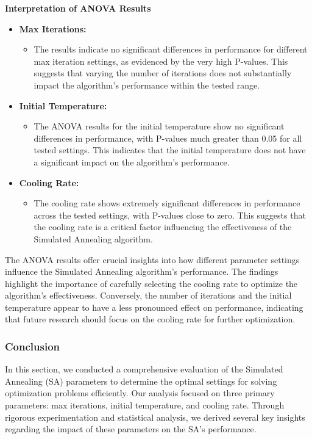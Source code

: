 \documentclass[
]{article}
\begin{document}
    \textbf{Interpretation of ANOVA Results}

    \begin{itemize}
        \item \textbf{Max Iterations:}
        \begin{itemize}
            \item The results indicate no significant differences in performance for different max iteration settings, as evidenced by the very high P-values. This suggests that varying the number of iterations does not substantially impact the algorithm's performance within the tested range.
        \end{itemize}
        \item \textbf{Initial Temperature:}
        \begin{itemize}
            \item The ANOVA results for the initial temperature show no significant differences in performance, with P-values much greater than 0.05 for all tested settings. This indicates that the initial temperature does not have a significant impact on the algorithm's performance.
        \end{itemize}
        \item \textbf{Cooling Rate:}
        \begin{itemize}
            \item The cooling rate shows extremely significant differences in performance across the tested settings, with P-values close to zero. This suggests that the cooling rate is a critical factor influencing the effectiveness of the Simulated Annealing algorithm.
        \end{itemize}
    \end{itemize}

    The ANOVA results offer crucial insights into how different parameter settings influence the Simulated Annealing algorithm's performance. The findings highlight the importance of carefully selecting the cooling rate to optimize the algorithm's effectiveness. Conversely, the number of iterations and the initial temperature appear to have a less pronounced effect on performance, indicating that future research should focus on the cooling rate for further optimization.

    \subsubsection{Conclusion}

    In this section, we conducted a comprehensive evaluation of the Simulated Annealing (SA) parameters to determine the optimal settings for solving optimization problems efficiently. Our analysis focused on three primary parameters: max iterations, initial temperature, and cooling rate. Through rigorous experimentation and statistical analysis, we derived several key insights regarding the impact of these parameters on the SA's performance.
\end{document}

